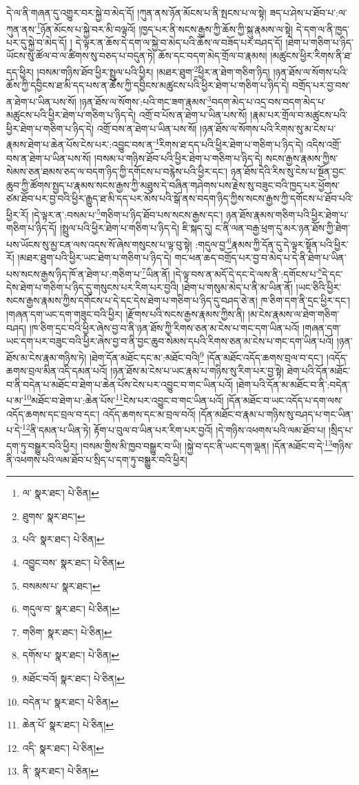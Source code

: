 དེ་ལ་ནི་གཞན་དུ་འགྱུར་བར་སྐྱེ་བ་མེད་དོ། །ཀུན་ནས་ཉོན་མོངས་པ་ནི་སྤངས་པ་ལ་སྟེ། ཟད་པ་ཤེས་པ་ཐོབ་པ་:ལ་ཀུན་ནས་\footnote{ལ་  སྣར་ཐང་།  པེ་ཅིན། }ཉོན་མོངས་པ་སྐྱེ་བར་མི་བལྟའོ། །ཁྱད་པར་ནི་སངས་རྒྱས་ཀྱི་ཆོས་ཀྱི་སྐུ་རྣམས་ལ་སྟེ། དེ་དག་ལ་ནི་ཁྱད་པར་དུ་སྐྱེ་བ་མེད་དོ། །
དེ་ལྟར་ན་ཆོས་དེ་དག་ལ་སྐྱེ་བ་མེད་པའི་ཆོས་ལ་བཟོད་པར་བཤད་དོ། །ཐེག་པ་གཅིག་པ་ཉིད་ཡོངས་སུ་ཚོལ་བ་ལ་ཚིགས་སུ་བཅད་པ་བདུན་ཏེ། ཆོས་དང་བདག་མེད་གྲོལ་བ་རྣམས། །མཚུངས་ཕྱིར་རིགས་ནི་ཐ་དད་ཕྱིར། །བསམ་གཉིས་ཐོབ་ཕྱིར་སྤྲུལ་པའི་ཕྱིར། །མཐར་ཐུག་\footnote{ཐུགས་  སྣར་ཐང་། }ཕྱིར་ན་ཐེག་གཅིག་ཉིད། །ཉན་ཐོས་ལ་སོགས་པའི་ཆོས་ཀྱི་དབྱིངས་ཐ་མི་དད་པས་ན་ཆོས་ཀྱི་དབྱིངས་མཚུངས་པའི་ཕྱིར་ཐེག་པ་གཅིག་པ་ཉིད་དེ། བགྲོད་པར་བྱ་བས་ན་ཐེག་པ་ཡིན་པས་སོ། །ཉན་ཐོས་ལ་སོགས་:པའི་གང་ཟག་རྣམས་\footnote{པའི་  སྣར་ཐང་།  པེ་ཅིན། }བདག་མེད་པ་འདྲ་བས་བདག་མེད་པ་མཚུངས་པའི་ཕྱིར་ཐེག་པ་གཅིག་པ་ཉིད་དེ། འགྲོ་བ་པོས་ན་ཐེག་པ་ཡིན་པས་སོ། །རྣམ་པར་གྲོལ་བ་མཚུངས་པའི་ཕྱིར་ཐེག་པ་གཅིག་པ་ཉིད་དེ། འགྲོ་བས་ན་ཐེག་པ་ཡིན་པས་སོ། །ཉན་ཐོས་ལ་སོགས་པའི་རིགས་སུ་མ་ངེས་པ་རྣམས་ཐེག་པ་ཆེན་པོས་ངེས་པར་:འབྱུང་བས་ན་\footnote{འབྱུང་བས་  སྣར་ཐང་།  པེ་ཅིན། }རིགས་ཐ་དད་པའི་ཕྱིར་ཐེག་པ་གཅིག་པ་ཉིད་དེ། འདིས་འགྲོ་བས་ན་ཐེག་པ་ཡིན་པས་སོ། །བསམ་པ་གཉིས་ཐོབ་པའི་ཕྱིར་ཐེག་པ་གཅིག་པ་ཉིད་དེ། སངས་རྒྱས་རྣམས་ཀྱིས་སེམས་ཅན་ཐམས་ཅད་ལ་བདག་ཉིད་ཀྱི་དགོངས་པ་བརྙེས་པའི་ཕྱིར་དང་། ཉན་ཐོས་དེའི་རིས་སུ་ངེས་པ་སྔོན་བྱང་ཆུབ་ཀྱི་ཚོགས་སྤྱད་པ་རྣམས་སངས་རྒྱས་ཀྱི་མཐུས་དེ་བཞིན་གཤེགས་པས་རྗེས་སུ་བཟུང་བའི་ཁྱད་པར་ཕྱོགས་ཙམ་ཐོབ་པར་བྱ་བའི་ཕྱིར་རྒྱུད་ཐ་མི་དད་པར་མོས་པའི་སྒོ་ནས་བདག་ཉིད་ཀྱིས་སངས་རྒྱས་ཀྱི་དགོངས་པ་ཐོབ་པའི་ཕྱིར་རོ། །དེ་ལྟར་ན་:བསམ་པ་\footnote{བསམས་པ་  སྣར་ཐང་། }གཅིག་པ་ཉིད་ཐོབ་པས་སངས་རྒྱས་དང་། ཉན་ཐོས་རྣམས་གཅིག་པའི་ཕྱིར་ཐེག་པ་གཅིག་པ་ཉིད་དོ། །སྤྲུལ་པའི་ཕྱིར་ཐེག་པ་གཅིག་པ་ཉིད་དེ། ཇི་སྐད་དུ། ང་ནི་ལན་བརྒྱ་ཕྲག་དུ་མར་ཉན་ཐོས་ཀྱི་ཐེག་པས་ཡོངས་སུ་མྱ་ངན་ལས་འདས་སོ་ཞེས་གསུངས་པ་ལྟ་བུ་སྟེ། :གདུལ་བྱ་\footnote{གདུལ་བ་  སྣར་ཐང་།  པེ་ཅིན། }རྣམས་ཀྱི་དོན་དུ་དེ་ལྟར་སྟོན་པའི་ཕྱིར་རོ། །མཐར་ཐུག་པའི་ཕྱིར་ཡང་ཐེག་པ་གཅིག་པ་ཉིད་དེ། གང་ཕན་ཆད་བགྲོད་པར་བྱ་བ་མེད་པ་དེ་ནི་ཐེག་པ་ཡིན་པས་སངས་རྒྱས་ཉིད་ཁོ་ན་ཐེག་པ་:གཅིག་པ་\footnote{གཅིག་  སྣར་ཐང་།  པེ་ཅིན། }ཡིན་ནོ། །དེ་ལྟ་བས་ན་མདོ་དེ་དང་དེ་ལས་ནི་:དགོངས་པ་\footnote{དགོས་པ་  སྣར་ཐང་།  པེ་ཅིན། }དེ་དང་དེས་ཐེག་པ་གཅིག་པ་ཉིད་དུ་གསུངས་པར་རིག་པར་བྱའི། །ཐེག་པ་གསུམ་མེད་པ་ནི་མ་ཡིན་ནོ། །ཡང་ཅིའི་ཕྱིར་སངས་རྒྱས་རྣམས་ཀྱིས་དགོངས་པ་དེ་དང་དེས་ཐེག་པ་གཅིག་པ་ཉིད་དུ་བཤད་ཅེ་ན། ཁ་ཅིག་དག་ནི་དྲང་ཕྱིར་དང་། །གཞན་དག་ཡང་དག་གཟུང་བའི་ཕྱིར། །རྫོགས་པའི་སངས་རྒྱས་རྣམས་ཀྱིས་ནི། །མ་ངེས་རྣམས་ལ་ཐེག་གཅིག་བཤད། །ཁ་ཅིག་དྲང་བའི་ཕྱིར་ཞེས་བྱ་བ་ནི་ཉན་ཐོས་ཀྱི་རིགས་ཅན་མ་ངེས་པ་གང་དག་ཡིན་པའོ། །གཞན་དག་ཡང་དག་པར་བཟུང་བའི་ཕྱིར་ཞེས་བྱ་བ་ནི་བྱང་ཆུབ་སེམས་དཔའི་རིགས་ཅན་མ་ངེས་པ་གང་དག་ཡིན་པའོ། །ཉན་ཐོས་མ་ངེས་རྣམ་གཉིས་ཏེ། །ཐེག་དོན་མཐོང་དང་མ་:མཐོང་བའི།\footnote{མཐོང་བའོ།  སྣར་ཐང་།  པེ་ཅིན། } །དོན་མཐོང་འདོད་ཆགས་བྲལ་བ་དང་། །འདོད་ཆགས་བྲལ་མིན་འདི་དམན་པའོ། །ཉན་ཐོས་མ་ངེས་པ་ཡང་རྣམ་པ་གཉིས་སུ་རིག་པར་བྱ་སྟེ། ཐེག་པའི་དོན་མཐོང་བ་ནི་བདེན་པ་མཐོང་བ་ཐེག་པ་ཆེན་པོས་ངེས་པར་འབྱུང་བ་གང་ཡིན་པའོ། །ཐེག་པའི་དོན་མ་མཐོང་བ་ནི་:བདེན་པ་མ་\footnote{བདེན་པ་  སྣར་ཐང་།  པེ་ཅིན། }མཐོང་བ་ཐེག་པ་:ཆེན་པོས་\footnote{ཆེན་པོ་  སྣར་ཐང་།  པེ་ཅིན། }ངེས་པར་འབྱུང་བ་གང་ཡིན་པའོ། །དོན་མཐོང་བ་ཡང་འདོད་པ་དག་ལས་འདོད་ཆགས་དང་བྲལ་བ་དང་། འདོད་ཆགས་དང་མ་བྲལ་བའོ། །དོན་མཐོང་བ་རྣམ་པ་གཉིས་སུ་བཤད་པ་གང་ཡིན་པ་དེ་\footnote{འདི་  སྣར་ཐང་།  པེ་ཅིན། }ནི་དམན་པ་ཡིན་ཏེ། རྟོག་པ་བུལ་བ་ཡིན་པར་རིག་པར་བྱའོ། །དེ་གཉིས་འཕགས་པའི་ལམ་ཐོབ་པ། །སྲིད་པ་དག་ཏུ་བསྒྱུར་བའི་ཕྱིར། །བསམ་གྱིས་མི་ཁྱབ་བསྒྱུར་བ་ཡི། །སྐྱེ་བ་དང་ནི་ཡང་དག་ལྡན། །དོན་མཐོང་བ་དེ་\footnote{ནི་  སྣར་ཐང་།  པེ་ཅིན། }གཉིས་ནི་འཕགས་པའི་ལམ་ཐོབ་པ་སྲིད་པ་དག་ཏུ་བསྒྱུར་བའི་ཕྱིར། 